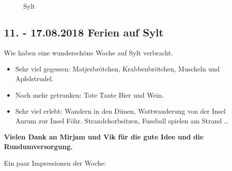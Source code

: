 \begin{figure}[b]
   \centering
   \quad
   \quad
   \quad
   \caption[Sylt]{Sylt}
\end{figure}

\subsection{11. - 17.08.2018 Ferien auf Sylt}
Wie haben eine wunderschöne Woche auf Sylt verbracht.

\begin{itemize}
\item Sehr viel gegessen: Matjesbrötchen, Krabbenbrötchen, Muscheln und Apfelstrudel.
\item Noch mehr getrunken: Tote Tante Bier und Wein.
\item Sehr viel erlebt: Wandern in den Dünen, Wattwanderung von der Insel Anrum zur Insel Föhr. Strandchorbsitzen, Fussball spielen am Strand \dots 
\end{itemize} 

\begin{center}
\textbf{Vielen Dank an Mirjam und Vik für die gute Idee und die Rundumversorgung.} 
\end{center}

Ein paar Impressionen der Woche:


